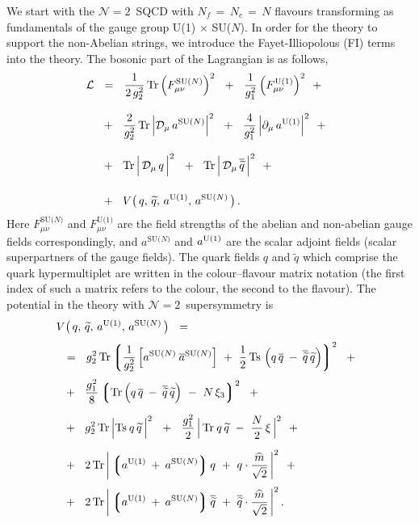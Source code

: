 \documentclass[12pt]{article}
\newcommand{\ntwo}{${\mathcal N}=2$}
\newcommand{\p}{\partial}
\newcommand{\wt}{\widetilde}
\newcommand{\ov}{\overline}
\newcommand{\md}{\mathcal{D}}
\newcommand{\ml}{\mathcal{L}}
\newcommand{\lgr}{\left\lgroup}
\newcommand{\rgr}{\right\rgroup}
\newcommand{\aU}{a^{\rm U(1)}}
\newcommand{\aN}{a^\text{SU($N$)}}
\newcommand{\baN}{\ov{a}{}^\text{SU($N$)}}
\newcommand{\qt}{\wt{q}}
\newcommand{\bq}{\ov{q}}
\newcommand{\bqt}{\overline{\widetilde{q}}}
\newcommand{\Tr}{\text{Tr}}
\newcommand{\Ts}{\text{Ts}}
\newcommand{\mhat}{\widehat{m}}
\begin{document}
	We start with the \ntwo\, SQCD with $ N_f \,=\, N_c \,=\, N $ flavours transforming as fundamentals 
	of the gauge group U(1)$\,\times\,$SU($N$).
	In order for the theory to support the non-Abelian strings, we introduce the Fayet-Illiopolous (FI) terms into the
	theory.
	The bosonic part of the Lagrangian is as follows,
\begin{align}
%
\notag
	\ml    & ~~=~~
	\frac{1}{2\, g_2^2}\, \Tr\, \Big( F_{\mu\nu}^\text{SU($N$)} \Big)^2  ~~+~~
	\frac{1}{g_1^2}\, \Big( F_{\mu\nu}^\text{U(1)} \Big)^2  ~~+~~
	\\[3mm]
%
\notag
	&
	~~+~~
	\frac{2}{g_2^2}\, \Tr\, \Big| \md_\mu\, \aN \Big|^2  ~~+~~
	\frac{4}{g_1^2}\, \Big| \p_\mu\, \aU \Big|^2  ~~+~~
	\\[3mm]
%
\label{bulk}
	&
	~~+~~
	\Tr\, \Big|\, \md_\mu\, q \,\Big|^2  ~~+~~
	\Tr\, \Big|\, \md_\mu\, \bqt \,\Big|^2
	~~+~~
	\\[4mm]
%
\notag
	&
	~~+~~
	V \big(\, q,\, \qt,\, \aU,\, \aN \,\big) \,.
\end{align}
	Here $ F_{\mu\nu}^\text{SU($N$)} $ and $ F_{\mu\nu}^\text{U(1)} $ are the field strengths
	of the abelian and non-abelian gauge fields correspondingly, 
	and $ \aN $ and $ \aU $ are the scalar adjoint fields (scalar superpartners of the gauge fields).
	The quark fields $ q $ and $ \qt $ which comprise the quark hypermultiplet are written in the
	colour--flavour matrix notation (the first index of such a matrix refers to the colour, the second
	to the flavour).
	The potential in the theory with \ntwo\, supersymmetry is
\begin{align}
%
\notag
	&
	V \big(\, q,\, \qt,\, \aU,\, \aN \,\big) ~~=~~ 
	\\[1mm]
%
\notag
	&
	~~=~~
	g_2^2\, \Tr \lgr \frac{1}{g_2^2}\, \Big[ \aN\: \baN \Big]  ~+~  \frac{1}{2}\, \Ts\, \left( q\,\bq \:-\: \bqt\,\qt \right) \rgr^2 
	~~+~~
	\\[1mm]
%
\notag
	&
	~~+~~
	\frac{g_1^2}{8} \lgr  \Tr \left( q\,\bq \:-\: \bqt\,\qt \right) ~-~ N\,\xi_3  \rgr^2
	~~+~~
	\\[2mm]
%
\label{pot}
	&
	~~+~~
	g_2^2\, \Tr\, \Big| \Ts\: q\,\qt \,\Big|^2
	~~+~~
	\frac{g_1^2}{2}\, \Big|\, \Tr\: q\,\qt  ~-~  \frac{N}{2}\,\xi \,\Big|^2
	~~+~~
	\\[2mm]
%
\notag
	&
	~~+~~
	2\, \Tr\, \bigg| \lgr \aU \:+\: \aN \rgr q  ~+~  q \cdot \frac{\mhat}{\sqrt{2}} \,\bigg|^2
	~~+~~
	\\[1mm]
%
\notag
	&
	~~+~~
	2\, \Tr\, \bigg| \lgr \aU \:+\: \aN \rgr \bqt  ~+~  \bqt \cdot \frac{\mhat}{\sqrt{2}} \,\bigg|^2
	\,.
\end{align}
\end{document}
